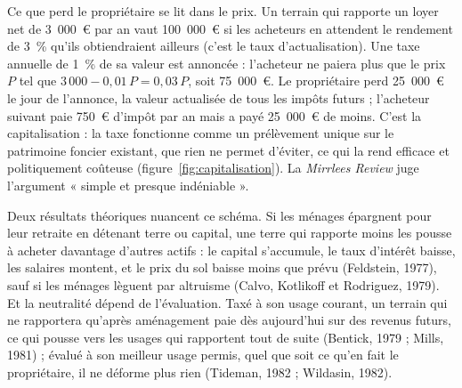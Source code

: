 \documentclass[11pt,a4paper]{article}
\begin{document}
Ce que perd le propriétaire se lit dans le prix. Un terrain qui rapporte un loyer net de 3~000~€
par an vaut 100~000~€ si les acheteurs en attendent le rendement de 3~\% qu'ils obtiendraient
ailleurs (c'est le taux d'actualisation). Une taxe annuelle de 1~\% de sa valeur est annoncée :
l'acheteur ne paiera plus que le prix $P$ tel que $3\,000 - 0{,}01\,P = 0{,}03\,P$, soit 75~000~€.
Le propriétaire perd 25~000~€ le jour de l'annonce, la valeur actualisée de tous les impôts futurs ;
l'acheteur suivant paie 750~€ d'impôt par an mais a payé 25~000~€ de moins. C'est la
capitalisation : la taxe fonctionne comme un prélèvement unique sur le patrimoine foncier existant,
que rien ne permet d'éviter, ce qui la rend efficace et politiquement coûteuse
(figure~\ref{fig:capitalisation}). La \emph{Mirrlees Review} juge l'argument « simple et presque
indéniable ».


Deux résultats théoriques nuancent ce schéma. Si les ménages épargnent pour leur retraite en
détenant terre ou capital, une terre qui rapporte moins les pousse à acheter davantage d'autres
actifs : le capital s'accumule, le taux d'intérêt baisse, les salaires montent, et le prix du sol
baisse moins que prévu (Feldstein, 1977),
sauf si les ménages lèguent par altruisme (Calvo, Kotlikoff et Rodriguez, 1979). Et la neutralité dépend de
l'évaluation. Taxé à son usage courant, un terrain qui ne rapportera qu'après aménagement paie dès
aujourd'hui sur des revenus futurs, ce qui pousse vers les usages qui rapportent tout de suite
(Bentick, 1979 ; Mills, 1981) ; évalué à son meilleur usage permis, quel que soit ce qu'en fait le
propriétaire, il ne déforme plus rien (Tideman, 1982 ; Wildasin, 1982).
\end{document}

